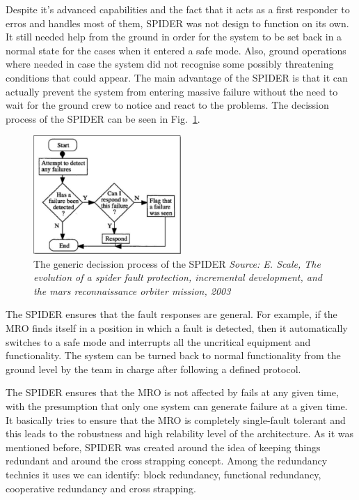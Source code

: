 Despite it's advanced capabilities and the fact that it acts as a first
responder to erros and handles most of them, SPIDER was not design to function
on its own. It still needed help from the ground in order for the system to be
set back in a normal state for the cases when it entered a safe mode. Also,
ground operations where needed in case the system did not recognise some
possibly threatening conditions that could appear. The main advantage of the
SPIDER is that it can actually prevent the system from entering massive failure
without the need to wait for the ground crew to notice and react to the
problems. The decission process of the SPIDER can be seen in
Fig.~\ref{fig:spider}.

\begin{figure}[htb]
	\begin{center}
	\includegraphics[width=0.5\textwidth]{img/spider.png}
	\caption{The generic decission process of the SPIDER\small{\textit{ Source: E.
	Scale, The evolution of a spider fault protection, incremental development, and
	the mars reconnaissance orbiter mission, 2003}}}
	\label{fig:spider}
	\end{center}
\end{figure}


The SPIDER ensures that the fault responses are general. For example, if the MRO
finds itself in a position in which a fault is detected, then it automatically
switches to a safe mode and interrupts all the uncritical equipment and
functionality. The system can be turned back to normal functionality from the
ground level by the team in charge after following a defined protocol.

The SPIDER ensures that the MRO is not affected by fails at any given time, with
the presumption that only one system can generate failure at a given time. It
basically tries to ensure that the MRO is completely single-fault tolerant and
this leads to the robustness and high relability level of the architecture. As
it was mentioned before, SPIDER was created around the idea of keeping things
redundant and around the cross strapping concept. Among the
redundancy technics it uses we can identify: block redundancy, functional
redundancy, cooperative redundancy and cross strapping.

